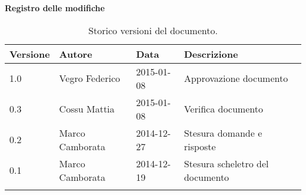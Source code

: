 \begin{Large}
	\textbf{Registro delle modifiche}
\end{Large}

\begin{longtable}{|l|l|l|p{}|}
\hline
\textbf{Versione} & \textbf{Autore} & \textbf{Data} & \textbf{Descrizione} \\
\hline
1.0 & Vegro Federico & 2015-01-08 & Approvazione documento \\
\hline
0.3 & Cossu Mattia & 2015-01-08 & Verifica documento \\
\hline
0.2 & Marco Camborata & 2014-12-27 & Stesura domande e risposte \\
\hline
0.1 & Marco Camborata & 2014-12-19 & Stesura scheletro del documento \\
\hline
\caption{Storico versioni del documento.}
\end{longtable}
